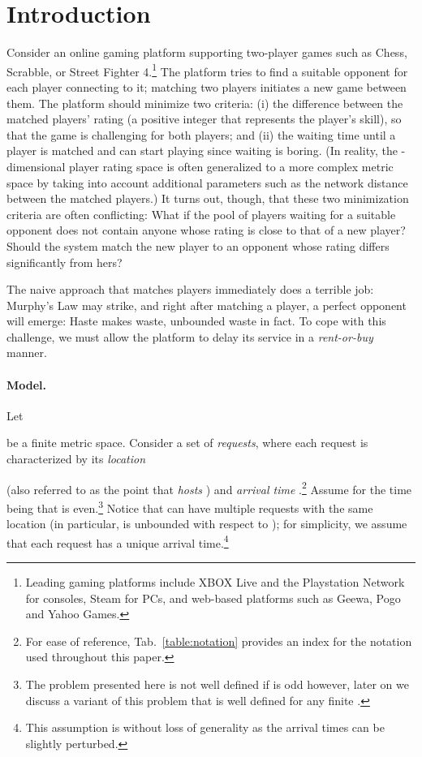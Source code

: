 \documentclass[11pt]{article}
\theoremstyle{definition}
\theoremstyle{plain}
\theoremstyle{definition}
\theoremstyle{plain}
\theoremstyle{definition}
\theoremstyle{plain}
\newcommand{\NotationLabel}[1]{\label{notationTable:#1}\ignorespaces}
\newcommand{\Tabl}{Tab.}
\begin{document}

\section{Introduction}
\label{section:introduction}
Consider an online gaming platform supporting two-player games such as Chess,
Scrabble, or Street Fighter 4.\footnote{Leading gaming platforms include XBOX Live and the Playstation Network for
consoles, Steam for PCs, and web-based platforms such as Geewa, Pogo and Yahoo
Games.}
The platform tries to find a suitable opponent for each player connecting to
it;
matching two players initiates a new game between them.
The platform should minimize two criteria:
(i) the difference between the matched players' rating (a positive integer
that represents the player's skill), so that the game is challenging for both
players; and
(ii) the waiting time until a player is matched and can start playing since
waiting is boring.
(In reality, the -dimensional player rating space is often generalized to a
more complex metric space by taking into account additional parameters such as
the network distance between the matched players.)
It turns out, though, that these two minimization criteria are often
conflicting:
What if the pool of players waiting for a suitable opponent does not contain
anyone whose rating is close to that of a new player?
Should the system match the new player to an opponent whose rating differs
significantly from hers?

The naive approach that matches players immediately does
a terrible job:
Murphy's Law may strike, and right after matching a player, a perfect opponent
will emerge:
Haste makes waste, unbounded waste in fact.
To cope with this challenge, we must allow the platform to delay its
service in a \emph{rent-or-buy} manner.

\paragraph{Model.}
Let

be a finite metric space.
Consider a set  of \emph{requests}, where each request 
is characterized by its \emph{location}

\NotationLabel{model:location}
(also referred to as the point that \emph{hosts} ) and \emph{arrival
time}
.\footnote{
For ease of reference, \Tabl{}~\ref{table:notation} provides an index for the
notation used throughout this paper.
}
\NotationLabel{model:arrival-time}
Assume for the time being that  is even.\footnote{The problem presented here is not well defined if  is odd however, later
on we discuss a variant of this problem that is well defined for any finite
.
}
Notice that  can have multiple requests with the same location (in
particular,  is unbounded with respect to );
for simplicity, we assume that each request has a unique arrival
time.\footnote{This assumption is without loss of generality as the arrival times can be
slightly perturbed.
}
\end{document}
